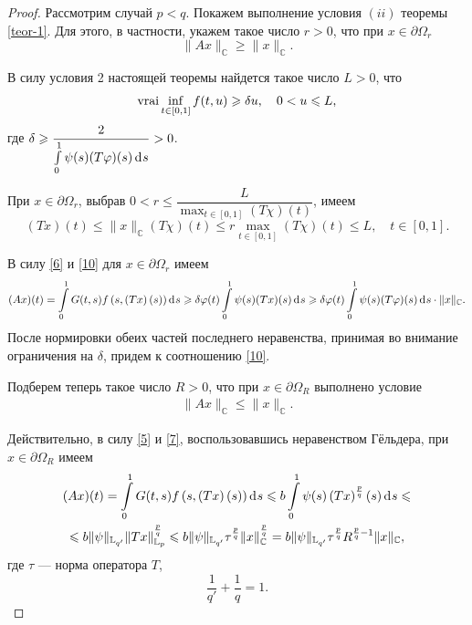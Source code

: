 \documentclass[press]{vestnik}
\begin{document}
\begin{proof}
Рассмотрим случай $p<q$. Покажем выполнение условия $(ii)$ теоремы \ref{teor-1}. Для этого, в частности, укажем такое число $r>0$, что при $x\in\partial\Omega_r$
\begin{equation}\label{9}
\|Ax\|_{\mathbb{C}}\geqslant \|x\|_{\mathbb{C}}.
\end{equation}

В силу условия 2 настоящей теоремы найдется такое число $L>0$, что
\begin{align}
\mathop{\rm vrai}\inf_{t\in[0,1]}f(t,u)\geqslant \delta u, \quad 0<u\leqslant L, \label{10}
\end{align}
где $\delta \geqslant \dfrac{2}{\int\limits_0^1 \psi(s)(T\varphi)(s)\d s}>0$.

При $x\in \partial\Omega_r$, выбрав $0<r\leqslant\dfrac{L}{\max_{t\in[0,1]}(T\chi)(t)}$,  имеем
\[
(Tx)(t)\leqslant \|x\|_{\mathbb{C}}(T\chi)(t) \leqslant r \max_{t\in [0,1]}(T\chi)(t)\leqslant L, \quad t\in[0,1].
\]

В силу \eqref{6} и \eqref{10} для $x\in \partial\Omega_r$ имеем
\[
(Ax)(t)=\int\limits_0^1 G(t,s)f \left (s,\left(Tx \right)(s) \right)\d s\geqslant \delta\varphi(t)\int\limits_0^1 \psi(s)(Tx)(s)\d s\geqslant\delta\varphi(t)\int\limits_0^1 \psi(s)(T\varphi)(s)\d s\cdot \|x\|_{\mathbb{C}}.
\]
После нормировки обеих частей последнего неравенства, принимая во внимание ограничения на $\delta$, придем к соотношению \eqref{10}.

Подберем теперь такое число $R>0$, что при  $x\in \partial\Omega_R$ выполнено условие
\begin{align}
\|Ax\|_{\mathbb{C}}\leqslant \|x\|_{\mathbb{C}}. \label{11}
\end{align}

Действительно, в силу \eqref{5} и \eqref{7}, воспользовавшись неравенством Гёльдера, при $x\in \partial\Omega_R$ имеем
\begin{multline*}
(Ax)(t)=\int\limits_0^1 G(t,s)f \left (s,\left(Tx \right)(s) \right)\d s \leqslant b \int\limits_0^1 \psi(s)\left (Tx \right)^{\frac{p}{q}}(s)\d s\leqslant\\
\leqslant b \|\psi\|_{\mathbb{L}_{q'}} \|Tx\|^\frac{p}{q}_{\mathbb{L}_p}\leqslant b \|\psi\|_{\mathbb{L}_{q'}} \tau^\frac{p}{q} \|x\|^\frac{p}{q}_{\mathbb{C}}=b\|\psi\|_{\mathbb{L}_{q'}} \tau^\frac{p}{q} R^{\frac{p}{q}-1}\|x\|_{\mathbb{C}},
\end{multline*}
где $\tau$ --- норма оператора $T$, 
\[
\frac{1}{q'}+\frac{1}{q}=1.
\]


\end{proof}
\end{document}
